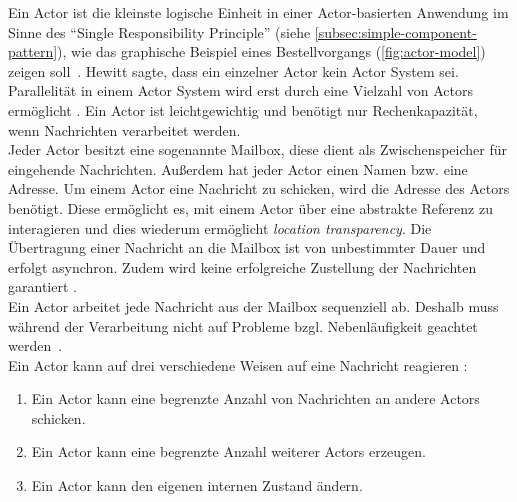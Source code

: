 Ein Actor ist die kleinste logische Einheit in einer Actor-basierten Anwendung im Sinne des \enquote{Single Responsibility Principle} (siehe \ref{subsec:simple-component-pattern}), wie das graphische Beispiel eines Bestellvorgangs (\autoref{fig:actor-model}) zeigen soll~\cite[S.~13]{vernon_reactive_2016}. Hewitt sagte, dass ein einzelner Actor kein Actor System sei. Parallelität in einem Actor System wird erst durch eine Vielzahl von Actors ermöglicht \cite[S.~15]{vernon_reactive_2016}. Ein Actor ist leichtgewichtig und benötigt nur Rechenkapazität, wenn Nachrichten verarbeitet werden.\\
Jeder Actor besitzt eine sogenannte Mailbox, diese dient als Zwischenspeicher für eingehende Nachrichten. Außerdem hat jeder Actor einen Namen bzw. eine Adresse. Um einem Actor eine Nachricht zu schicken, wird die Adresse des Actors benötigt. Diese ermöglicht es, mit einem Actor über eine abstrakte Referenz zu interagieren und dies wiederum ermöglicht \textit{location transparency}. Die Übertragung einer Nachricht an die Mailbox ist von unbestimmter Dauer und erfolgt asynchron. Zudem wird keine erfolgreiche Zustellung der Nachrichten garantiert \cite[S.~84]{erb_concurrent_2012} \cite[S.~83]{kuhn_reactive_2015}.\\
Ein Actor arbeitet jede Nachricht aus der Mailbox sequenziell ab. Deshalb muss während der Verarbeitung nicht auf Probleme bzgl. Nebenläufigkeit geachtet werden~\cite[S.~14]{vernon_reactive_2016}.\\
Ein Actor kann auf drei verschiedene Weisen auf eine Nachricht reagieren \cite[S.~84]{erb_concurrent_2012}:

\begin{enumerate}
\item Ein Actor kann eine begrenzte Anzahl von Nachrichten an andere Actors schicken.
\item Ein Actor kann eine begrenzte Anzahl weiterer Actors erzeugen.
\item Ein Actor kann den eigenen internen Zustand ändern.
\end{enumerate}

